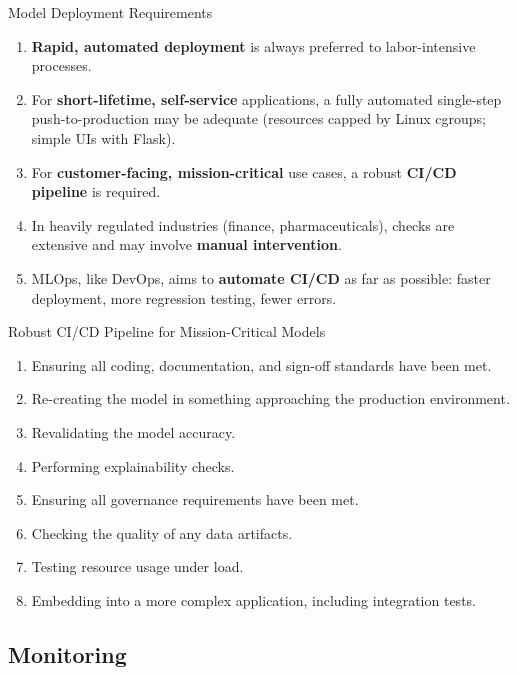 \begin{frame}{Model Deployment Requirements}
\begin{enumerate}
\item<1-> \textbf{Rapid, automated deployment} is always preferred to labor-intensive processes.
\item<2-> For \textbf{short-lifetime, self-service} applications, a fully automated single-step push-to-production may be adequate (resources capped by Linux cgroups; simple UIs with Flask).
\item<3-> For \textbf{customer-facing, mission-critical} use cases, a robust \textbf{CI/CD pipeline} is required.
\item<4-> In heavily regulated industries (finance, pharmaceuticals), checks are extensive and may involve \textbf{manual intervention}.
\item<5-> MLOps, like DevOps, aims to \textbf{automate CI/CD} as far as possible: faster deployment, more regression testing, fewer errors.
\end{enumerate}
\end{frame}

\begin{frame}{Robust CI/CD Pipeline for Mission-Critical Models}
\begin{enumerate}
\item<1-> Ensuring all coding, documentation, and sign-off standards have been met.
\item<2-> Re-creating the model in something approaching the production environment.
\item<3-> Revalidating the model accuracy.
\item<4-> Performing explainability checks.
\item<5-> Ensuring all governance requirements have been met.
\item<6-> Checking the quality of any data artifacts.
\item<7-> Testing resource usage under load.
\item<8-> Embedding into a more complex application, including integration tests.
\end{enumerate}
\end{frame}

\subsection{Monitoring}

